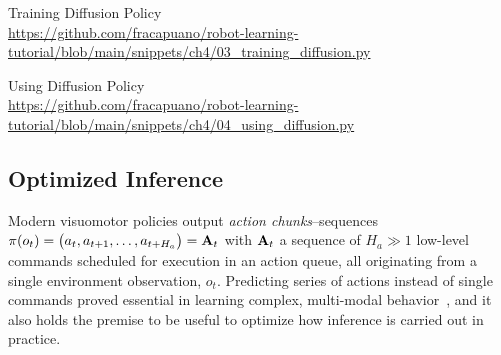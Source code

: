 \begin{pbox}[label={ex:diffusion_training}]{Training Diffusion Policy \\ \url{https://github.com/fracapuano/robot-learning-tutorial/blob/main/snippets/ch4/03_training_diffusion.py}}
    
\end{pbox}

\begin{pbox}[label={ex:diffusion_using}]{Using Diffusion Policy \\ \url{https://github.com/fracapuano/robot-learning-tutorial/blob/main/snippets/ch4/04_using_diffusion.py}}
    
\end{pbox}

\subsection{Optimized Inference}
\label{sec:ch4-async-inference}
Modern visuomotor policies output \emph{action chunks}--sequences \(\pi(o_t) = \bigl(a_t,a_{t+1},\dots,a_{t+H_a}\bigr) = \mathbf{A}_t \) with \(\mathbf{A}_t \) a sequence of \(H_a \gg 1 \) low-level commands scheduled for execution in an action queue, all originating from a single environment observation, \(o_t\).
Predicting series of actions instead of single commands proved essential in learning complex, multi-modal behavior~\citep{zhaoLearningFineGrainedBimanual2023,chiDiffusionPolicyVisuomotor2024}, and it also holds the premise to be useful to optimize how inference is carried out in practice.

